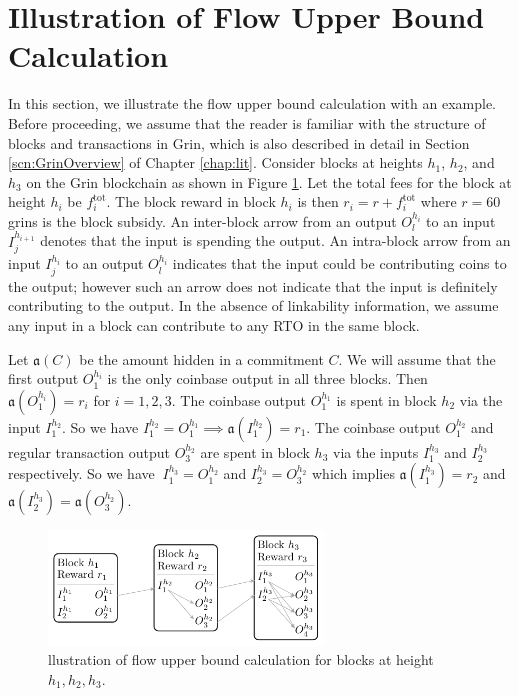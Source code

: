 \section{Illustration of Flow Upper Bound Calculation}
\label{scn:MainIdea}
In this section, we illustrate the flow upper bound calculation with an example.
Before proceeding, we assume that the reader is familiar with the structure of blocks and transactions in Grin, which is also described in detail in Section \ref{scn:GrinOverview} of Chapter \ref{chap:lit}.
Consider blocks at heights $h_1$, $h_2$, and $h_3$ on the Grin blockchain as shown in Figure \ref{block_sample}.
Let the total fees for the block at height $h_i$ be $f^{\text{tot}}_i$.
The block reward in block $h_i$ is then $r_i = r + f^{\text{tot}}_i$ where $r=60$ grins is the block subsidy.
An inter-block arrow from an output $O_l^{h_i}$ to an input $I_{j}^{h_{i+1}}$ denotes that the input is spending the output.
An intra-block arrow from an input $I_j^{h_i}$ to an output $O_l^{h_i}$ indicates that the input could be contributing coins to the output; however such an arrow does not indicate that the input is definitely contributing to the output. In the absence of linkability information, we assume any input in a block can contribute to any RTO in the same block.


Let $\mathfrak{a}(C)$ be the amount hidden in a commitment $C$.
We will assume that the first output $O_1^{h_i}$ is the only coinbase output in all three blocks. Then $\mathfrak{a}(O_1^{h_i}) = r_i$ for $i=1,2,3$.
The coinbase output $O_1^{h_1}$ is spent in block $h_2$ via the input $I_1^{h_2}$. So we have $I_1^{h_2} = O_1^{h_1} \implies \mathfrak{a}(I_1^{h_2}) = r_1$. The coinbase output $O_1^{h_2}$ and regular transaction output $O_3^{h_2}$ are spent in block $h_3$ via the inputs $I_1^{h_3}$ and $I_2^{h_3}$ respectively.
So we have $\ I_1^{h_3} = O_1^{h_2}$ and $I_2^{h_3} = O_3^{h_2}$ which implies $\mathfrak{a}(I_1^{h_3}) = r_2$ and $\mathfrak{a}(I_2^{h_3}) = \mathfrak{a}(O_3^{h_2})$.

\begin{figure}[!t]
  \centering
  \includegraphics[width=0.65\textwidth]{Figures/grin_blocks1.pdf}
  \caption{llustration of flow upper bound calculation for blocks at height $h_1, h_2, h_3$.}
  \label{block_sample}
\end{figure}

